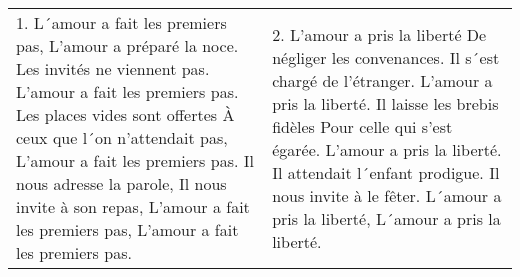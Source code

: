 \begin{tabular}{p{} p{}}
1.
L´amour a fait les premiers pas,\newline
L'amour a préparé la noce.\newline
Les invités ne viennent pas.\newline
L'amour a fait les premiers pas.\newline
Les places vides sont offertes\newline
À ceux que l´on n'attendait pas,\newline
L'amour a fait les premiers pas.\newline
Il nous adresse la parole,\newline
Il nous invite à son repas,\newline
L'amour a fait les premiers pas,\newline
L'amour a fait les premiers pas.
&
2.
L'amour a pris la liberté\newline
De négliger les convenances.\newline
Il s´est chargé de l'étranger.\newline
L'amour a pris la liberté.\newline
Il laisse les brebis fidèles\newline
Pour celle qui s'est égarée.\newline
L'amour a pris la liberté.\newline
Il attendait l´enfant prodigue.\newline
Il nous invite à le fêter.\newline
L´amour a pris la liberté,\newline
L´amour a pris la liberté.
\end{tabular}
